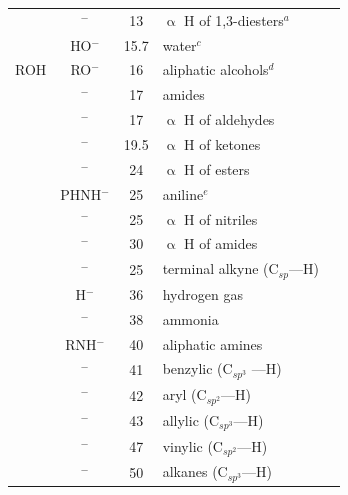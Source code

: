 \documentclass[10pt]{article}
\begin{document}
\begin{center}
\begin{tabular}{ccSll}
                &   $^{-}$ & 13                 &   $\upalpha$ H of 1,3-diesters$^{\textit{a}}$& \\          
                      &   HO$^{-}$         &   15.7                      &   water$^{\textit{c}}$ & \\
               ROH            &   RO$^{-}$         &   16                        &   aliphatic alcohols$^{\textit{d}}$ & \\
                 &   $^{-}$ & 17                        &   amides & \\
                 &   $^{-}$ & 17                       &   $\upalpha$ H of aldehydes& \\
                 &   $^{-}$ & 19.5                   &   $\upalpha$ H of ketones& \\
                &   $^{-}$ & 24                      &   $\upalpha$ H of esters& \\
                    &   PHNH$^{-}$       &   25                        &   aniline$^{\textit{e}}$ & \\
                    &   $^{-}$ & 25                      &   $\upalpha$ H of nitriles& \\          
                 &   $^{-}$ & 30                   &   $\upalpha$ H of amides& \\          
                    &   $^{-}$  &   25                        &   terminal alkyne (C$_{sp}$---H) & \\
                       &   H$^{-}$          &   36                        &   hydrogen gas & \\
                      &   $^{-}$   &   38                        &   ammonia & \\
                     &   RNH$^{-}$        &   40                        &   aliphatic amines & \\ 
                    &   $^{-}$ &   41                        &   benzylic (C$_{sp^3}$ ---H) & \\
                     &    $^{-}$ &   42                        &   aryl (C$_{sp^2}$---H) & \\
                &   $^{-}$ &  43                     &   allylic (C$_{sp^3}$---H) & \\
                  &   $^{-}$ &  47                        &   vinylic (C$_{sp^2}$---H) & \\
                      &   $^{-}$   &   50                     &   alkanes (C$_{sp^3}$---H) & \\ 
               \bottomrule
          \end{tabular}
\end{center}
\end{document}

